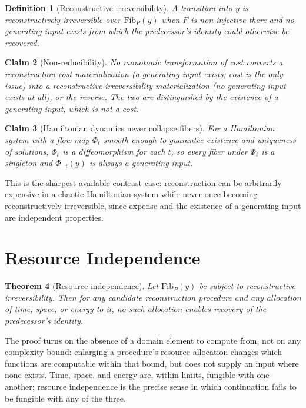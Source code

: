 \documentclass[12pt]{report}
\newtheorem{definition}{Definition}[section]
\newtheorem{theorem}[definition]{Theorem}
\newtheorem{claim}[definition]{Claim}
\begin{document}
\begin{definition}[Reconstructive irreversibility]
A transition into $y$ is reconstructively irreversible over
$\mathrm{Fib}_P(y)$ when $F$ is non-injective there and no generating
input exists from which the predecessor's identity could otherwise be
recovered.
\end{definition}

\begin{claim}[Non-reducibility]
No monotonic transformation of cost converts a reconstruction-cost
materialization (a generating input exists; cost is the only issue) into
a reconstructive-irreversibility materialization (no generating input
exists at all), or the reverse. The two are distinguished by the
existence of a generating input, which is not a cost.
\end{claim}

\begin{claim}[Hamiltonian dynamics never collapse fibers]
For a Hamiltonian system with a flow map $\Phi_t$ smooth enough to
guarantee existence and uniqueness of solutions, $\Phi_t$ is a
diffeomorphism for each $t$, so every fiber under $\Phi_t$ is a
singleton and $\Phi_{-t}(y)$ is always a generating input.
\end{claim}

This is the sharpest available contrast case: reconstruction can be
arbitrarily expensive in a chaotic Hamiltonian system while never once
becoming reconstructively irreversible, since expense and the existence
of a generating input are independent properties.

\section*{Resource Independence}

\begin{theorem}[Resource independence]
Let $\mathrm{Fib}_P(y)$ be subject to reconstructive irreversibility.
Then for any candidate reconstruction procedure and any allocation of
time, space, or energy to it, no such allocation enables recovery of the
predecessor's identity.
\end{theorem}

The proof turns on the absence of a domain element to compute from, not
on any complexity bound: enlarging a procedure's resource allocation
changes which functions are computable within that bound, but does not
supply an input where none exists. Time, space, and energy are, within
limits, fungible with one another; resource independence is the precise
sense in which continuation fails to be fungible with any of the three.
\end{document}
